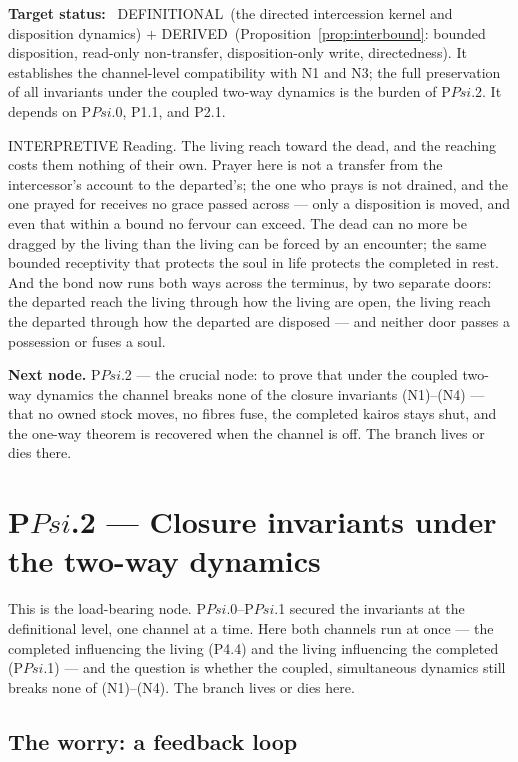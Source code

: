 \documentclass[11pt,a4paper]{article}
\def\Psi{Psi}%
\def\emph#1{#1}%
\newcommand{\stDerived}{\textcolor{cDer}{\textsf{\small DERIVED}}}
\newcommand{\stDef}{\textcolor{cDef}{\textsf{\small DEFINITIONAL}}}
\newcommand{\stInterp}{\textcolor{cInt}{\textsf{\small INTERPRETIVE}}}
\theoremstyle{definition}
\theoremstyle{plain}
\theoremstyle{remark}
\begin{document}
\textbf{Target status:}~
\stDef\ (the directed intercession kernel and disposition dynamics) \(+\) \stDerived\
(Proposition~\ref{prop:interbound}: bounded disposition, read-only non-transfer,
disposition-only write, directedness). It establishes the channel-level compatibility with N1
and N3; the full preservation of all invariants under the coupled two-way dynamics is the
burden of P$\Psi$.2. It depends on P$\Psi$.0, P1.1, and P2.1.

\medskip
\stInterp\quad
\emph{Reading.}
The living reach toward the dead, and the reaching costs them nothing of their own. Prayer
here is not a transfer from the intercessor's account to the departed's; the one who prays is
not drained, and the one prayed for receives no grace passed across --- only a disposition is
moved, and even that within a bound no fervour can exceed. The dead can no more be dragged by
the living than the living can be forced by an encounter; the same bounded receptivity that
protects the soul in life protects the completed in rest. And the bond now runs both ways
across the terminus, by two separate doors: the departed reach the living through how the
living are open, the living reach the departed through how the departed are disposed --- and
neither door passes a possession or fuses a soul.

\medskip
\textbf{Next node.} P$\Psi$.2 --- the crucial node: to prove that under the coupled two-way
dynamics the channel breaks none of the closure invariants (N1)--(N4) --- that no owned stock
moves, no fibres fuse, the completed kairos stays shut, and the one-way theorem is recovered
when the channel is off. The branch lives or dies there.

\section{P$\Psi$.2 --- Closure invariants under the two-way dynamics}

This is the load-bearing node. P$\Psi$.0--P$\Psi$.1 secured the invariants at the
\emph{definitional} level, one channel at a time. Here both channels run at once --- the
completed influencing the living (P4.4) and the living influencing the completed (P$\Psi$.1) ---
and the question is whether the coupled, simultaneous dynamics still breaks none of (N1)--(N4).
The branch lives or dies here.

\subsection{The worry: a feedback loop}
\end{document}
